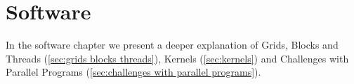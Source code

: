 \chapter{Software}
\label{chap:software}

In the software chapter we present a deeper explanation of Grids, Blocks and Threads (\cref{sec:grids blocks threads}), Kernels (\cref{sec:kernels}) and Challenges with Parallel Programs (\cref{sec:challenges with parallel programs}).




